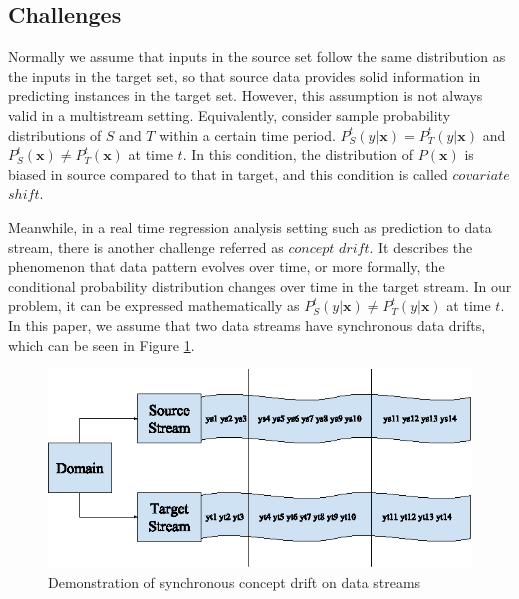 \documentclass[conference,compsoc]{IEEEtran}
\begin{document}
\subsection{Challenges}
\label{challenges}
Normally we assume that inputs in the source set follow the
same distribution as the inputs in the target set, so that
source
data provides solid information in predicting instances in
the target set. However, this assumption is not always valid in 
a multistream setting. Equivalently, consider sample
probability distributions of $S$ and $T$ within a certain time period.
$P_{S}^{t}(y|\textbf{x}) = P_{T}^{t}(y|\textbf{x})$ and $P_{S}^{t}(\textbf{x}) \neq P_{T}^{t}
(\textbf{x})$ at time $t$. In this condition, the distribution of $P(\textbf{x})$ is biased 
in source compared to that in target, and this condition is called 
$covariate$ $shift$.

Meanwhile, in a real time regression analysis setting such as prediction to data stream, there is another challenge referred as $concept$ $drift$. It describes the phenomenon that data pattern evolves over time, or more formally, the
conditional probability distribution changes over time in the target stream. In our problem, it can be expressed mathematically as 
$P_{S}^{t}(y|\textbf{x}) \neq P_{T}^{t}(y|\textbf{x})$ at time $t$. In this paper, we assume
that two data streams have
synchronous data drifts, which can be seen in Figure
\ref{fig:multistream}.



\begin{figure}
\centering
\includegraphics{fig_multistream.eps}
\caption{Demonstration of synchronous concept drift on data streams}
\label{fig:multistream}
\end{figure}
\end{document}
